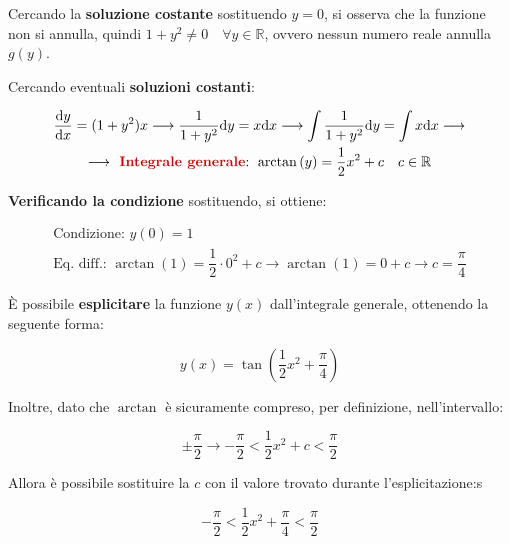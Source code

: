 \documentclass[a4paper]{article}
\begin{document}
	\noindent
	Cercando la \textbf{soluzione costante} sostituendo $y = 0$, si osserva che la funzione non si annulla, quindi $1 + y^2 \ne 0 \hspace{1em} \forall y \in \mathbb{R}$, ovvero nessun numero reale annulla $g(y)$.
	
	\noindent
	Cercando eventuali \textbf{soluzioni costanti}:
	
	\begin{gather*}
		\dfrac{\mathrm{d}y}{\mathrm{d}x} = (1 + y^2) x \longrightarrow \dfrac{1}{1 + y^2} \mathrm{d}y = x \mathrm{d}x \longrightarrow \int{\dfrac{1}{1 + y^2} \mathrm{d}y} = \int{x \mathrm{d}x} \longrightarrow \\
		\longrightarrow \textcolor{Red3}{\textbf{ Integrale generale}}\text{: } \arctan{\left(y\right)} = \dfrac{1}{2} x^2 + c \hspace{1em} c \in \mathbb{R}
	\end{gather*}

	\noindent
	\textbf{Verificando la condizione} sostituendo, si ottiene:
	
	\begin{gather*}
		\text{Condizione: } y(0) = 1 \\
		\text{Eq. diff.: } \arctan{\left(1\right)} = \dfrac{1}{2}\cdot 0^2 + c \longrightarrow \arctan{\left(1\right)} = 0 + c \longrightarrow c = \dfrac{\pi}{4}
	\end{gather*}
	
	\noindent
	È possibile \textbf{esplicitare} la funzione $y(x)$ dall'integrale generale, ottenendo la seguente forma:
	
	\begin{equation*}
		y(x) = \tan{\left(\dfrac{1}{2}x^2 + \dfrac{\pi}{4}\right)}
	\end{equation*}

	\noindent
	Inoltre, dato che $\arctan$ è sicuramente compreso, per definizione, nell'intervallo:
	
	\begin{equation*}
		\pm \dfrac{\pi}{2} \longrightarrow -\dfrac{\pi}{2} < \dfrac{1}{2} x^2 + c < \dfrac{\pi}{2}
	\end{equation*}

	\noindent
	Allora è possibile sostituire la $c$ con il valore trovato durante l'esplicitazione:s
	
	\begin{equation*}
		-\dfrac{\pi}{2} < \dfrac{1}{2} x^2 + \dfrac{\pi}{4} < \dfrac{\pi}{2}
	\end{equation*}
\end{document}

